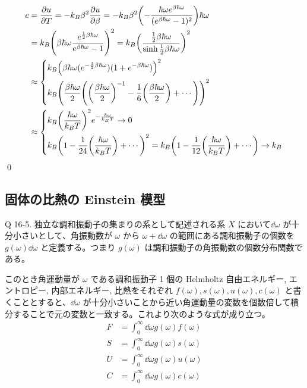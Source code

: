 \documentclass[uplatex,dvipdfmx,a4paper,11pt]{jlreq}
\makeatletter
\theoremstyle{definition}
\renewenvironment{proof}[1][\proofname]{\par
  \normalfont
  \topsep6\p@\@plus6\p@ \trivlist
  \item[\hskip\labelsep{\bfseries #1}\@addpunct{\bfseries}]\ignorespaces\quad\par
}{%
  \qed\endtrivlist\@endpefalse
}
\renewcommand\proofname{証明}
\makeatother
\begin{document}
\begin{proof}
\begin{align}
    c & = \pdv{u}{T} = -k_B\beta^2\pdv{u}{\beta} = -k_B\beta^2\qty(-\frac{\hbar\omega e^{\beta\hbar\omega}}{(e^{\beta\hbar\omega} - 1)^2})\hbar\omega                                   \\
      & = k_B\qty(\beta\hbar\omega\frac{e^{\frac{1}{2}\beta\hbar\omega}}{e^{\beta\hbar\omega} - 1})^2 = k_B\qty(\frac{\frac{1}{2}\beta\hbar\omega}{\sinh\frac{1}{2}\beta\hbar\omega})^2 \\
      & \approx \begin{dcases}
                  k_B\qty(\beta\hbar\omega(e^{-\frac{1}{2}\beta\hbar\omega})(1 + e^{-\beta\hbar\omega}))^2                                                \\
                  k_B\qty(\frac{\beta\hbar\omega}{2}\qty(\qty(\frac{\beta\hbar\omega}{2})^{-1} - \frac{1}{6}\qty(\frac{\beta\hbar\omega}{2}) + \cdots))^2 \\
                \end{dcases}                                                                             \\
      & \approx \begin{dcases}
                  k_B\qty(\frac{\hbar\omega}{k_BT})^2e^{-\frac{\hbar\omega}{k_BT}} \to 0 \\
                  k_B\qty(1 - \frac{1}{24}\qty(\frac{\hbar\omega}{k_BT}) + \cdots)^2 = k_B\qty(1 - \frac{1}{12}\qty(\frac{\hbar\omega}{k_BT}) + \cdots) \to k_B
                \end{dcases}
  \end{align}
\end{proof}


\subsection{固体の比熱の Einstein 模型}
\begin{itembox}[l]{Q 16-5.}
  独立な調和振動子の集まりの系として記述される系 $X$ において$\dd{\omega}$ が十分小さいとして、角振動数が $\omega$ から $\omega + \dd{\omega}$ の範囲にある調和振動子の個数を $g(\omega)\dd{\omega}$ と定義する。つまり $g(\omega)$ は調和振動子の角振動数の個数分布関数である。
\end{itembox}
このとき角運動量が $\omega$ である調和振動子 1 個の Helmholtz 自由エネルギー, エントロピー, 内部エネルギー, 比熱をそれぞれ $f(\omega), s(\omega), u(\omega), c(\omega)$ と書くこととすると、$\dd{\omega}$ が十分小さいことから近い角運動量の変数を個数倍して積分することで元の変数と一致する。これより次のような式が成り立つ。
\begin{align}
  F & = \int_0^\infty\dd{\omega}g(\omega)f(\omega) \\
  S & = \int_0^\infty\dd{\omega}g(\omega)s(\omega) \\
  U & = \int_0^\infty\dd{\omega}g(\omega)u(\omega) \\
  C & = \int_0^\infty\dd{\omega}g(\omega)c(\omega)
\end{align}
\end{document}
